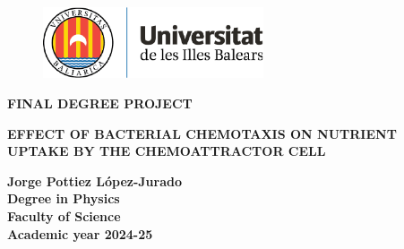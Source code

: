 \begin{titlepage}
    
    \vspace*{5mm}
    \begin{figure}[h!]
    \includegraphics[width=6.5cm]{Images/logo.pdf}
    \end{figure}
    
    {
    \selectfont
    \vspace{15mm}
    \raggedright
    \LARGE\textbf{FINAL DEGREE PROJECT}\\
    \vspace{25mm}
    
    \raggedleft
    \LARGE\textbf{EFFECT OF BACTERIAL CHEMOTAXIS ON NUTRIENT UPTAKE BY THE CHEMOATTRACTOR CELL}\\
    \vspace{30mm}
    
    \raggedright
    \LARGE\textbf{Jorge Pottiez López-Jurado}\\
    \vspace{12mm}
    \large\textbf{Degree in Physics}\\
    \vspace{7mm}
    \large\textbf{Faculty of Science}\\
    \vspace{20mm}
    \normalsize\textbf{Academic year 2024-25}\\
    }
\end{titlepage}

{
\newpage
\thispagestyle{empty}
\mbox{}
\newpage
}

